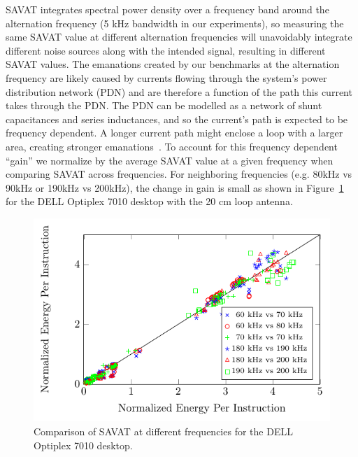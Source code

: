 SAVAT integrates spectral power density over a frequency band around the alternation frequency (5 kHz bandwidth in our experiments), so measuring the same SAVAT value at different alternation frequencies will unavoidably integrate different noise sources along with the intended signal, resulting in different SAVAT values. The emanations created by our benchmarks at the alternation frequency are likely caused by currents flowing through the system's power distribution network (PDN) and are therefore a function of the path this current takes through the PDN. The PDN can be modelled as a network of shunt capacitances and series inductances, and so the current's path is expected to be frequency dependent. A longer current path might enclose a loop with a larger area, creating stronger emanations~\cite{Ott09}. To account for this frequency dependent ``gain'' we normalize by the average SAVAT value at a given frequency when comparing SAVAT across frequencies. For neighboring frequencies (e.g. 80kHz vs 90kHz or 190kHz vs 200kHz), the change in gain is small as shown in Figure~\ref{fig:fdepend} for the DELL Optiplex 7010 desktop with the 20 cm loop antenna. %

\begin{figure}[htb]
	\centering
	\includegraphics[width=5in]{../TEMC_SAVAT/fdepend.pdf}
	\caption{Comparison of SAVAT at different frequencies for the DELL Optiplex 7010 desktop.}
  \label{fig:fdepend}  
\end{figure}

